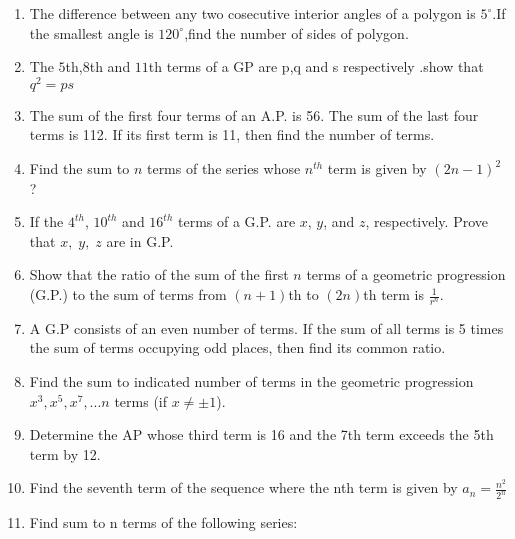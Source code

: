 \begin{enumerate}[label=\thesection.\arabic*,ref=\thesection.\theenumi]
\item The difference between any two cosecutive interior angles of a polygon is $5^\circ$.If the smallest angle is $120^\circ$,find the number of sides of polygon. \\
\solution

\pagebreak
\item The $5$th,$8$th and $11$th terms of a GP are p,q and s respectively .show that $q^2=ps$ \\
\solution

\pagebreak
\item The sum of the first four terms of an A.P. is 56. The sum of the last four terms is
 112. If its first term is 11, then find the number of terms.\\
\solution

\pagebreak
\item Find the sum to $n$ terms of the series whose $n^{th}$ term is given by $(2n-1)^2$ ? 
\solution
\pagebreak
\item If the $4^{th}$, $10^{th}$ and $16^{th}$ terms of a G.P. are $x$, $y$, and $z$, respectively. Prove that $x,\; y,\; z$ are in G.P. \\
\solution

\pagebreak
\item Show that the ratio of the sum of the first \(n\) terms of a geometric progression (G.P.) to the sum of terms from \((n+1)\)th to \((2n)\)th term is \(\frac{1}{r^n}\).
\solution
\pagebreak
\item A G.P consists of an even number of terms. If the sum of all terms is 5 times the sum of terms occupying odd places, then find its common ratio.\\
\solution

\pagebreak
\item Find the sum to indicated number of terms in the geometric progression $x^3,x^5,x^7,...n$ terms (if $x\neq\pm1$).\\
\solution

\pagebreak
\item Determine the AP whose third term is 16 and the 7th term exceeds the 5th term by 12. \\
\solution

\pagebreak
\item Find the seventh term of the sequence where the nth term is given by $a_n= \frac {n^2}{2^{n}}$\\
\solution

\pagebreak
\item Find sum to n terms of the following series:\\

\end{enumerate}

